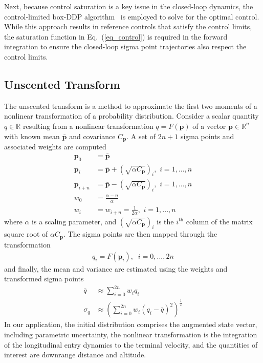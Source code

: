\documentclass[journal ]{new-aiaa}
\newcommand{\param}{\ensuremath{\mathbf{p}}}
\newcommand{\cov}{C}
\begin{document}
Next, because control saturation is a key issue in the closed-loop dynamics, the control-limited box-DDP algorithm~\cite{DDP_ControlLimited} is employed to solve for the optimal control. While this approach results in reference controls that satisfy the control limits, the saturation function in Eq.~(\ref{eq_control}) is required in the forward integration to ensure the closed-loop sigma point trajectories also respect the control limits.

\subsection*{Unscented Transform}
The unscented transform is a method to approximate the first two moments of a nonlinear transformation of a probability distribution. Consider a scalar quantity $q\in\mathbb{R}$ resulting from a nonlinear transformation $q = F(\param)$ of a vector $\param\in\mathbb{R}^n$ with known mean $ \bar{\param} $ and covariance $ \cov_{\param} $. A set of $2n+1$ sigma points and associated weights are computed 
\begin{align*}
\param_0 &= \bar{\param} \\
\param_i &=  \bar{\param} + \left(\sqrt{\alpha \cov_{\param}}\right)_i,\, \,i=1,...,n \\
\param_{i+n} &=  \bar{\param} - \left(\sqrt{\alpha\cov_{\param}}\right)_i, \, \,i=1,...,n\\
w_0 &= \frac{\alpha - n}{\alpha} \\
w_i &= w_{i+n} = \frac{1}{2\alpha}, \, \,i=1,...,n
\end{align*}
where $\alpha$ is a scaling parameter, and $\left(\sqrt{\alpha \cov_{\param}}\right)_i$ is the $i^{\mathrm{th}}$ column of the matrix square root of $\alpha \cov_{\param}$. The sigma points are then mapped through the transformation
\begin{align}
q_i = F(\param_i),\;\;i=0,...,2n
\end{align}
and finally, the mean and variance are estimated using the weights and transformed sigma points
\begin{align*}
\bar{q} &\approx \sum_{i=0}^{2n}w_iq_i\\
\sigma_{q} &\approx \left(\sum_{i=0}^{2n}w_i\left(q_i - \bar{q}\right)^2\right)^{\frac{1}{2}}
\end{align*}
In our application, the initial distribution comprises the augmented state vector, including parametric uncertainty, the nonlinear transformation is the integration of the longitudinal entry dynamics to the terminal velocity, and the quantities of interest are downrange distance and altitude. 
\end{document}
